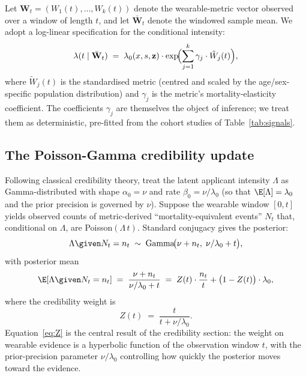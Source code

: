 Let $\mathbf{W}_t = (W_1(t),\dots,W_k(t))$ denote the wearable-metric
vector observed over a window of length $t$, and let
$\bar{\mathbf{W}}_t$ denote the windowed sample mean. We adopt a
log-linear specification for the conditional intensity:
\begin{equation}\label{eq:loglinear}
   \lambda(t \mid \bar{\mathbf{W}}_t)
   \;=\; \lambda_0(x,s,\mathbf{z}) \cdot
         \exp\!\Bigl(\sum_{j=1}^k \gamma_j \cdot
                     \tilde W_j(t)\Bigr),
\end{equation}
where $\tilde W_j(t)$ is the standardised metric (centred and scaled
by the age/sex-specific population distribution) and $\gamma_j$ is
the metric's mortality-elasticity coefficient. The coefficients
$\gamma_j$ are themselves the object of inference; we treat them as
deterministic, pre-fitted from the cohort studies of
Table~\ref{tab:signals}.

\subsection{The Poisson-Gamma credibility update}\label{ss:cred-update}

Following classical credibility theory, treat the latent applicant
intensity $\Lambda$ as Gamma-distributed with shape
$\alpha_0=\nu$ and rate $\beta_0=\nu/\lambda_0$ (so that $\E[\Lambda]
= \lambda_0$ and the prior precision is governed by $\nu$). Suppose
the wearable window $[0,t]$ yields observed counts of metric-derived
``mortality-equivalent events'' $N_t$ that, conditional on $\Lambda$,
are Poisson$(\Lambda\,t)$. Standard conjugacy gives the posterior:
\begin{equation}\label{eq:posterior}
   \Lambda \given N_t = n_t \;\sim\;
   \mathrm{Gamma}\!\bigl(\nu + n_t,\;
                          \nu/\lambda_0 + t\bigr),
\end{equation}
with posterior mean
\begin{equation}\label{eq:postmean}
   \E[\Lambda \given N_t = n_t]
   \;=\; \frac{\nu + n_t}{\nu/\lambda_0 + t}
   \;=\; Z(t)\cdot \frac{n_t}{t}
        + \bigl(1-Z(t)\bigr)\cdot \lambda_0,
\end{equation}
where the credibility weight is
\begin{equation}\label{eq:Z}
   \boxed{\;Z(t) \;=\; \frac{t}{t + \nu/\lambda_0}.\;}
\end{equation}
Equation~\eqref{eq:Z} is the central result of the credibility
section: the weight on wearable evidence is a hyperbolic function of
the observation window $t$, with the prior-precision parameter
$\nu/\lambda_0$ controlling how quickly the posterior moves toward
the evidence.

